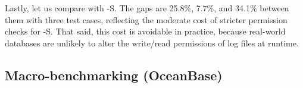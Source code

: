 Lastly, let us compare \odes with \odes-S.
The gaps are
 {25.8\%}, 7.7\%, and 34.1\%   between them with three test cases, reflecting 
   the moderate cost of stricter permission checks for \odes-S.
That said,
this cost is avoidable in practice, because real-world databases are   unlikely to alter the write/read permissions of log files at runtime.

\subsection{Macro-benchmarking (OceanBase)}\label{sec:eval:ob}

